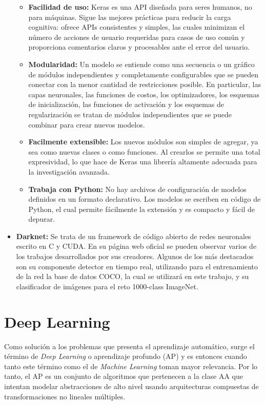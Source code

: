 \documentclass[a4paper, 12pt, spanish, chapterprefix, numbers=noenddot]{book}
\begin{document}
\begin{itemize}
\begin{itemize}
\item \textbf{Facilidad de uso:} Keras es una API diseñada para seres humanos, no para máquinas. Sigue las mejores prácticas para reducir la carga cognitiva: ofrece APIs consistentes y simples, las cuales minimizan el número de acciones de usuario requeridas para casos de uso común y proporciona comentarios claros y procesables ante el error del usuario.
\item \textbf{Modularidad:} Un modelo se entiende como una secuencia o un gráfico de módulos independientes y completamente configurables que se pueden conectar con la menor cantidad de restricciones posible. En particular, las capas neuronales, las funciones de costos, los optimizadores, los esquemas de inicialización, las funciones de activación y los esquemas de regularización se tratan de módulos independientes que se puede combinar para crear nuevos modelos.
\item \textbf{Facilmente extensible:} Los nuevos módulos son simples de agregar, ya sea como nuevas clases o como funciones. Al crearlos se permite una total expresividad, lo que hace de Keras una librería altamente adecuada para la investigación avanzada.
\item \textbf{Trabaja con Python:} No hay archivos de configuración de modelos definidos en un formato declarativo. Los modelos se escriben en código de Python, el cual permite fácilmente la extensión y es compacto y fácil de depurar.
\end{itemize}
\item \textbf{Darknet\cite{Darknet}:} Se trata de un framework de código abierto de redes neuronales escrito en C y CUDA. En su página web oficial se pueden observar varios de los trabajos desarrollados por sus creadores. Algunos de los más destacados son su componente detector en tiempo real, utilizando para el entrenamiento de la red la base de datos COCO, la cual se utilizará en este trabajo, y su clasificador de imágenes para el reto 1000-class ImageNet.
\end{itemize}


\section{Deep Learning}

Como solución a los problemas que presenta el aprendizaje automático, surge el término de \textit{Deep Learning} o aprendizaje profundo (AP) y es entonces cuando tanto este término como el de \textit{Machine Learning} toman mayor relevancia. Por lo tanto, el AP es un conjunto de algoritmos que pertenecen a la clase AA que intentan modelar abstracciones de alto nivel usando arquitecturas compuestas de transformaciones no lineales múltiples.\\
\end{document}
